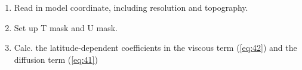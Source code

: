 
\begin{enumerate}

\item Read in model coordinate, including resolution and topography.
\item Set up T mask and U mask.
\item Calc. the latitude-dependent coefficients in the viscous term
  (\ref{eq:42}) and the diffusion term (\ref{eq:41})

\end{enumerate}



